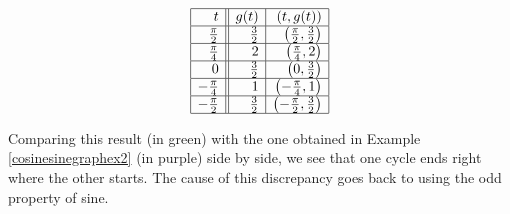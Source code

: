 \documentclass{ximera}
\begin{document}
\[ \begin{array}{|r||r|r|} \hline
t & g(t) & (t,g(t)) \\  \hline
\frac{\pi}{2} & \frac{3}{2} & \left(\frac{\pi}{2}, \frac{3}{2}\right)  \\ \hline
\frac{\pi}{4} & 2 & \left(\frac{\pi}{4}, 2\right) \\  \hline 
0 & \frac{3}{2} & \left(0, \frac{3}{2} \right)  \\  \hline 
-\frac{\pi}{4}  & 1 &  \left(-\frac{\pi}{4}, 1 \right) \\  \hline 
-\frac{\pi}{2} & \frac{3}{2} & \left(-\frac{\pi}{2}, \frac{3}{2} \right) \\   \hline
\end{array} \]




Comparing this result (in green) with the one obtained in Example \ref{cosinesinegraphex2} (in purple) side by side, we see that one cycle ends right where the other starts.  The cause of this discrepancy goes back to using the odd property of sine. 
\end{document}
